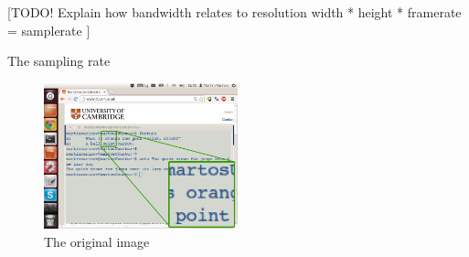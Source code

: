 \documentclass[a4paper,12pt,twoside,openright]{report}
\begin{document}
[TODO! Explain how bandwidth relates to resolution width * height * framerate = samplerate ]

The sampling rate

\begin{figure}[h!]
  \caption{The original image}
  \centering
    \includegraphics[width=0.5\textwidth]{sr_original}
\end{figure}
\end{document}
